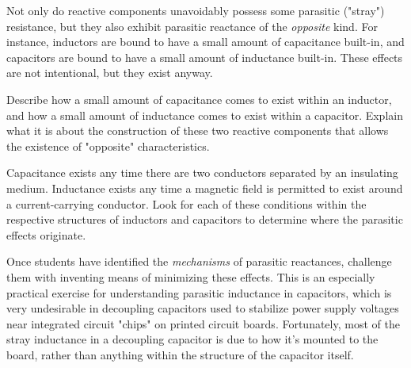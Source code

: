 

Not only do reactive components unavoidably possess some parasitic ("stray") resistance, but they also exhibit parasitic reactance of the {\it opposite} kind.  For instance, inductors are bound to have a small amount of capacitance built-in, and capacitors are bound to have a small amount of inductance built-in.  These effects are not intentional, but they exist anyway.

Describe how a small amount of capacitance comes to exist within an inductor, and how a small amount of inductance comes to exist within a capacitor.  Explain what it is about the construction of these two reactive components that allows the existence of "opposite" characteristics.







Capacitance exists any time there are two conductors separated by an insulating medium.  Inductance exists any time a magnetic field is permitted to exist around a current-carrying conductor.  Look for each of these conditions within the respective structures of inductors and capacitors to determine where the parasitic effects originate.







Once students have identified the {\it mechanisms} of parasitic reactances, challenge them with inventing means of minimizing these effects.  This is an especially practical exercise for understanding parasitic inductance in capacitors, which is very undesirable in decoupling capacitors used to stabilize power supply voltages near integrated circuit "chips" on printed circuit boards.  Fortunately, most of the stray inductance in a decoupling capacitor is due to how it's mounted to the board, rather than anything within the structure of the capacitor itself.



